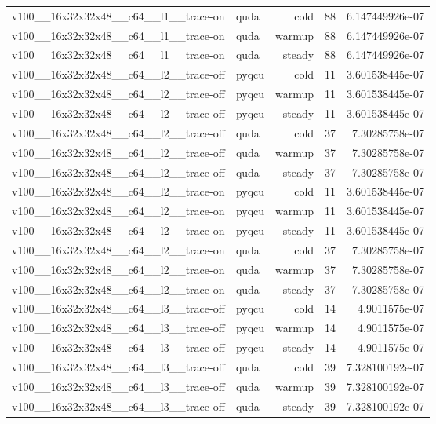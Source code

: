 \begin{table}[htbp]
\begin{tabular}{@{}llrrr@{}}
v100\_\_16x32x32x48\_\_c64\_\_l1\_\_trace-on & quda & cold & 88 & 6.147449926e-07 \\
v100\_\_16x32x32x48\_\_c64\_\_l1\_\_trace-on & quda & warmup & 88 & 6.147449926e-07 \\
v100\_\_16x32x32x48\_\_c64\_\_l1\_\_trace-on & quda & steady & 88 & 6.147449926e-07 \\
v100\_\_16x32x32x48\_\_c64\_\_l2\_\_trace-off & pyqcu & cold & 11 & 3.601538445e-07 \\
v100\_\_16x32x32x48\_\_c64\_\_l2\_\_trace-off & pyqcu & warmup & 11 & 3.601538445e-07 \\
v100\_\_16x32x32x48\_\_c64\_\_l2\_\_trace-off & pyqcu & steady & 11 & 3.601538445e-07 \\
v100\_\_16x32x32x48\_\_c64\_\_l2\_\_trace-off & quda & cold & 37 & 7.30285758e-07 \\
v100\_\_16x32x32x48\_\_c64\_\_l2\_\_trace-off & quda & warmup & 37 & 7.30285758e-07 \\
v100\_\_16x32x32x48\_\_c64\_\_l2\_\_trace-off & quda & steady & 37 & 7.30285758e-07 \\
v100\_\_16x32x32x48\_\_c64\_\_l2\_\_trace-on & pyqcu & cold & 11 & 3.601538445e-07 \\
v100\_\_16x32x32x48\_\_c64\_\_l2\_\_trace-on & pyqcu & warmup & 11 & 3.601538445e-07 \\
v100\_\_16x32x32x48\_\_c64\_\_l2\_\_trace-on & pyqcu & steady & 11 & 3.601538445e-07 \\
v100\_\_16x32x32x48\_\_c64\_\_l2\_\_trace-on & quda & cold & 37 & 7.30285758e-07 \\
v100\_\_16x32x32x48\_\_c64\_\_l2\_\_trace-on & quda & warmup & 37 & 7.30285758e-07 \\
v100\_\_16x32x32x48\_\_c64\_\_l2\_\_trace-on & quda & steady & 37 & 7.30285758e-07 \\
v100\_\_16x32x32x48\_\_c64\_\_l3\_\_trace-off & pyqcu & cold & 14 & 4.9011575e-07 \\
v100\_\_16x32x32x48\_\_c64\_\_l3\_\_trace-off & pyqcu & warmup & 14 & 4.9011575e-07 \\
v100\_\_16x32x32x48\_\_c64\_\_l3\_\_trace-off & pyqcu & steady & 14 & 4.9011575e-07 \\
v100\_\_16x32x32x48\_\_c64\_\_l3\_\_trace-off & quda & cold & 39 & 7.328100192e-07 \\
v100\_\_16x32x32x48\_\_c64\_\_l3\_\_trace-off & quda & warmup & 39 & 7.328100192e-07 \\
v100\_\_16x32x32x48\_\_c64\_\_l3\_\_trace-off & quda & steady & 39 & 7.328100192e-07 \\

\end{tabular}
\end{table}
